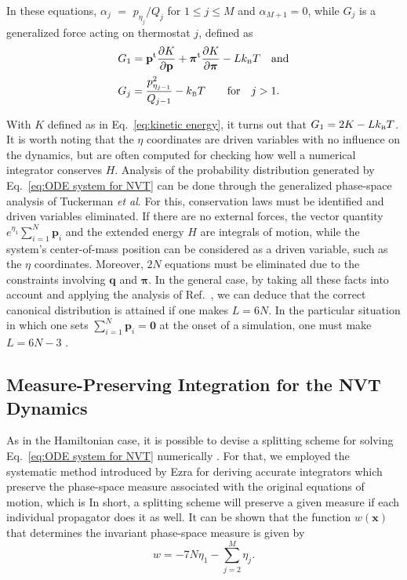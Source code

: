 \documentclass[
journal=jctcce,
layout=twocolumn
]{achemso}
\newcommand{\vt}[1]{\boldsymbol{\mathbf{#1}}}   %
\newcommand{\tr}[1]{#1^\text{t}}                %
\newcommand{\diff}[2]{\frac{\partial #1}{\partial #2}} %
\begin{document}
In these equations, $\alpha_j$ $=$ ${p_{\eta_j}}/{Q_j}$ for $1 \leq j \le M$ and $\alpha_{M+1} = 0$, while $G_j$ is a generalized force acting on thermostat $j$, defined as
\begin{subequations}
\begin{align}
\label{eq:generalized force NVT}
&G_1 = \tr{\vt p} \diff{K}{\vt p} + \tr{\vt \pi} \diff{K}{\vt \pi} - L k_\text{\tiny B} T \quad \text{and}\\
&G_j = \frac{p_{\eta_{j-1}}^2}{Q_{j-1}} - k_\text{\tiny B} T  \qquad \text{for} \quad j > 1.
\end{align}
\end{subequations}

With $K$ defined as in Eq.~\eqref{eq:kinetic energy}, it turns out that $G_1 = 2K - L k_\text{\tiny B} T$.
It is worth noting that the $\eta$ coordinates are driven variables with no influence on the dynamics, but are often computed for checking how well a numerical integrator conserves $H$.
Analysis of the probability distribution generated by Eq.~\eqref{eq:ODE system for NVT} can be done through the generalized phase-space analysis of Tuckerman \textit{et al}.\cite{Tuckerman_2001} For this, conservation laws must be identified and driven variables eliminated.
If there are no external forces, the vector quantity $e^{\eta_1}\sum_{i=1}^N {\vt p}_i$ and the extended energy $H$ are integrals of motion, while the system's center-of-mass position can be considered as a driven variable,\cite{Tuckerman_2001} such as the $\eta$ coordinates.
Moreover, $2N$ equations must be eliminated due to the constraints involving $\vt q$ and $\vt \pi$.
In the general case, by taking all these facts into account and applying the analysis of Ref.~, we can deduce that the correct canonical distribution is attained if one makes $L = 6N$.
In the particular situation in which one sets $\sum_{i=1}^N {\vt p}_i = \vt 0$ at the onset of a simulation, one must make $L = 6N - 3$ \cite{Martyna_1994}.

\subsection{Measure-Preserving Integration for the NVT Dynamics}
\label{sec:mttk}
As in the Hamiltonian case, it is possible to devise a splitting scheme for solving Eq.~\eqref{eq:ODE system for NVT} numerically \cite{Tuckerman_2010}. For that, we employed the systematic method introduced by Ezra \cite{Ezra_2006} for deriving accurate integrators which preserve the phase-space measure associated with the original equations of motion, which is 
In short, a splitting scheme will preserve a given measure if each individual propagator does it as well. 
It can be shown that the function $w(\vt x)$ that determines the invariant phase-space measure is given by
\begin{equation}
\label{eq:nhc_measure}
w = -7N \eta_1 - \sum_{j=2}^M \eta_j.
\end{equation}
\end{document}
